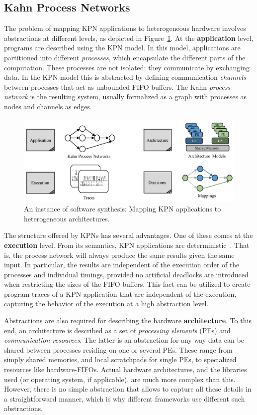 \documentclass[sigplan,10pt]{acmart}
\begin{document}
\subsection{Kahn Process Networks}

The problem of mapping KPN applications to heterogeneous hardware involves abstractions at different levels, as depicted in Figure~\ref{fig:problem}.
At the \textbf{application} level, programs are described using the KPN model. In this model, applications are partitioned into
different \emph{processes}, which encapsulate the different parts of the computation. These processes are not isolated;
they communicate by exchanging data. In the KPN model this is abstracted by defining communication \emph{channels}
between processes that act as unbounded FIFO buffers. The Kahn \emph{process network} is the resulting system, usually formalized as a graph 
with processes as nodes and channels as edges.

 \begin{figure}
 	\centering
 	\includegraphics[width=.48\textwidth]{figures/problem.pdf} 
 	\caption{An instance of software synthesis: Mapping KPN applications to heterogeneous architectures.}
 	\label{fig:problem}
 		\vspace{-3mm}
 \end{figure}

The structure offered by KPNs has several advantages. One of these comes at the \textbf{execution} level. 
From its semantics, KPN applications are deterministic~\cite{kahn74}. 
That is, the process network will always produce the same results given the same input.
In particular, the results are independent of the execution order of the processes and individual timings,
provided no artificial deadlocks are introduced when restricting the sizes of the FIFO buffers.
This fact can be utilized to create program traces of a KPN application that are independent of the execution,
capturing the behavior of the execution at a high abstraction level.

Abstractions are also required for describing the hardware \textbf{architecture}.
To this end, an architecture is described as a set of \emph{processing elements} (PEs) and \emph{communication resources}.
The latter is an abstraction for any way data can be shared between processes residing on one or several PEs. 
These range from simply shared memories, and local scratchpads for single PEs, to specialized resources like hardware-FIFOs.
Actual hardware architectures, and the libraries used (or operating system, if applicable), are much more complex than this.
However, there is no simple abstraction that allows to capture all these details in a straightforward manner, 
which is why different frameworks use different such abstractions.
\end{document}
